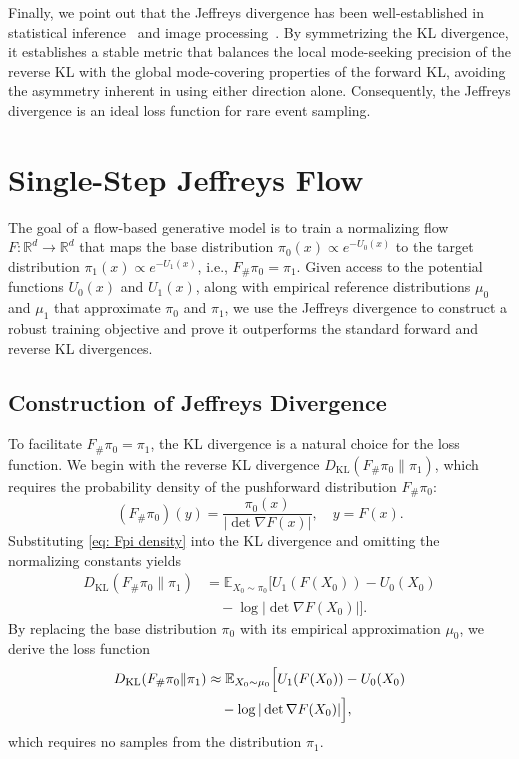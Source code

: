\documentclass[%
 reprint,
 amsmath,amssymb,
 aps,
 pre,
]{revtex4-2}
\DeclareMathOperator{\KL}{KL}
\begin{document}
Finally, we point out that the Jeffreys divergence has been well-established in statistical inference~\cite{moreno2003kullback, bayarri2008generalization, yao2011symmetric, sharma2021clustering} and image processing~\cite{nishii2006image, han2020active}. By symmetrizing the KL divergence, it establishes a stable metric that balances the local mode-seeking precision of the reverse KL with the global mode-covering properties of the forward KL, avoiding the asymmetry inherent in using either direction alone. Consequently, the Jeffreys divergence is an ideal loss function for rare event sampling.

\section{Single-Step Jeffreys Flow}
\label{section: single step}

The goal of a flow-based generative model is to train a normalizing flow $F:\mathbb{R}^d \to \mathbb{R}^d$ that maps the base distribution $\pi_0(x) \propto e^{-U_0(x)}$ to the target distribution $\pi_1(x) \propto e^{-U_1(x)}$, i.e., $F_{\#} \pi_0 = \pi_1$. Given access to the potential functions $U_0(x)$ and $U_1(x)$, along with empirical reference distributions $\mu_0$ and $\mu_1$ that approximate $\pi_0$ and $\pi_1$, we use the Jeffreys divergence to construct a robust training objective and prove it outperforms the standard forward and reverse KL divergences.

\subsection{Construction of Jeffreys Divergence}

To facilitate $F_{\#} \pi_0 = \pi_1$, the KL divergence is a natural choice for the loss function. We begin with the reverse KL divergence $D_{\KL}(F_\#\pi_0\|\pi_1)$, which requires the probability density of the pushforward distribution $F_{\#} \pi_0$:
\begin{equation}
	(F_\# \pi_0)(y) = \frac{\pi_0(x)}{|\det \nabla F(x)|},\quad y = F(x).
	\label{eq: Fpi density}
\end{equation}
Substituting \eqref{eq: Fpi density} into the KL divergence and omitting the normalizing constants yields
\begin{align*}
	D_{\KL}(F_\#\pi_0\|\pi_1) &= \mathbb E_{X_0 \sim \pi_0} \Big[ U_1(F(X_0)) - U_0(X_0) \\
	&\quad - \log|\det\nabla F(X_0)| \Big].
\end{align*}
By replacing the base distribution $\pi_0$ with its empirical approximation $\mu_0$, we derive the loss function
\begin{align}
	D_{\KL}(F_\#\pi_0\|\pi_1) &\approx \mathbb E_{X_0 \sim \mu_0} \Big[ U_1(F(X_0)) - U_0(X_0) \notag \\
	&\quad - \log|\det\nabla F(X_0)| \Big],
	\label{eq: rKL}
\end{align}
which requires no samples from the distribution $\pi_1$.
\end{document}
